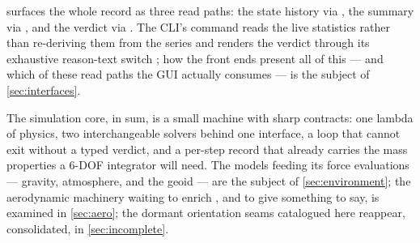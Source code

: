  surfaces the whole record as three read paths: the state history via
 , the summary via 
, and the verdict via  .
The CLI's  command reads the live statistics rather than re-deriving them from the
series  and renders the verdict through its exhaustive reason-text switch
; how the front ends present all of this --- and which of these read paths
the GUI actually consumes --- is the subject of \cref{sec:interfaces}.

The simulation core, in sum, is a small machine with sharp contracts: one lambda of physics, two
interchangeable solvers behind one interface, a loop that cannot exit without a typed verdict,
and a per-step record that already carries the mass properties a 6-DOF integrator will need. The
models feeding its force evaluations --- gravity, atmosphere, and the geoid --- are the subject
of \cref{sec:environment}; the aerodynamic machinery waiting to enrich , and to
give  something to say, is examined in \cref{sec:aero}; the dormant orientation
seams catalogued here reappear, consolidated, in \cref{sec:incomplete}.
